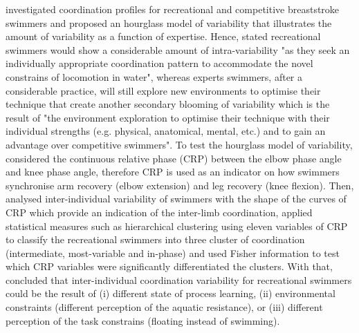 \cite{seifert2011} investigated coordination profiles for recreational and 
competitive breaststroke swimmers and proposed an hourglass model of 
variability that illustrates the amount of variability as a function of 
expertise. Hence, \citealt[p. 551]{seifert2011} stated 
recreational swimmers would show a considerable amount of intra-variability 
"as they seek an individually appropriate coordination pattern to accommodate
the novel constrains of locomotion in water", whereas experts swimmers, 
after a considerable practice,  
will still explore new environments to optimise their technique that 
create another secondary blooming of variability which is 
the result of "the environment exploration to optimise their technique 
with their individual strengths (e.g. physical, anatomical, mental, etc.)
and to gain an advantage over competitive swimmers".
To test the hourglass model of variability, 
\cite{seifert2011} considered the continuous relative phase (CRP) 
between the elbow phase angle and knee phase angle, therefore CRP 
is used as an indicator on how swimmers synchronise
arm recovery (elbow extension) and leg recovery (knee flexion).
Then, \cite{seifert2011} analysed inter-individual variability of 
swimmers with the shape of the curves of CRP which provide an indication 
of the inter-limb coordination, applied statistical measures such as 
hierarchical clustering using eleven variables of CRP 
to classify the recreational swimmers into three cluster of coordination 
(intermediate, most-variable and in-phase)
and used Fisher information to test which CRP variables were significantly 
differentiated the clusters. With that, \cite{seifert2011} concluded that 
inter-individual coordination variability for recreational swimmers could be 
the result of (i) different state of process learning, (ii) environmental 
constraints (different perception of the aquatic resistance), or (iii) 
different perception of the task constrains (floating instead of swimming).

